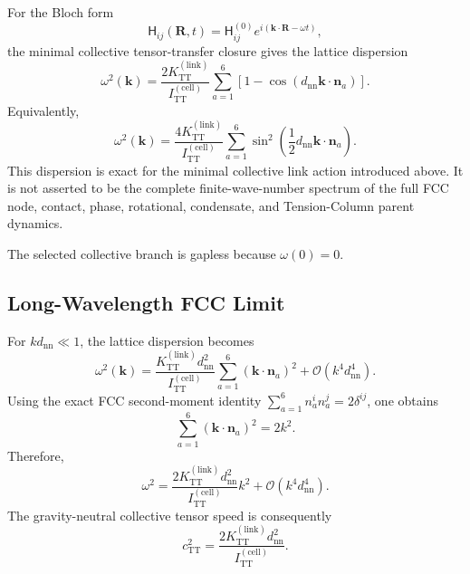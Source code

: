 For the Bloch form
\begin{equation}
    \mathsf{H}_{ij}(\mathbf{R},t) = \mathsf{H}_{ij}^{(0)} e^{i(\mathbf{k}\cdot\mathbf{R}-\omega t)},
\end{equation}
the minimal collective tensor-transfer closure gives the lattice dispersion
\begin{equation}
    \omega^{2}(\mathbf{k}) = \frac{ 2K_{\mathrm{TT}}^{(\mathrm{link})} }{ I_{\mathrm{TT}}^{(\mathrm{cell})} } \sum_{a=1}^{6} \left[ 1 - \cos \left( d_{\mathrm{nn}} \mathbf{k}\cdot\mathbf{n}_{a} \right) \right].
\end{equation}
Equivalently,
\begin{equation}
    \omega^{2}(\mathbf{k}) = \frac{ 4K_{\mathrm{TT}}^{(\mathrm{link})} }{ I_{\mathrm{TT}}^{(\mathrm{cell})} } \sum_{a=1}^{6} \sin^{2} \left( \frac{1}{2} d_{\mathrm{nn}} \mathbf{k}\cdot\mathbf{n}_{a} \right).
\end{equation}
This dispersion is exact for the minimal collective link action introduced above. It is not asserted to be the complete finite-wave-number spectrum of the full FCC node, contact, phase, rotational, condensate, and Tension-Column parent dynamics.

The selected collective branch is gapless because $\omega(0)=0$.

\subsection{Long-Wavelength FCC Limit}
\label{subsec:long_wavelength_fcc_limit}

For $k d_{\mathrm{nn}} \ll 1$, the lattice dispersion becomes
\begin{equation}
    \omega^{2}(\mathbf{k}) = \frac{ K_{\mathrm{TT}}^{(\mathrm{link})} d_{\mathrm{nn}}^{2} }{ I_{\mathrm{TT}}^{(\mathrm{cell})} } \sum_{a=1}^{6} (\mathbf{k}\cdot\mathbf{n}_{a})^{2} + \mathcal{O} \left( k^{4}d_{\mathrm{nn}}^{4} \right).
\end{equation}
Using the exact FCC second-moment identity $\sum_{a=1}^{6} n_{a}^{i}n_{a}^{j} = 2\delta^{ij}$, one obtains
\begin{equation}
    \sum_{a=1}^{6} (\mathbf{k}\cdot\mathbf{n}_{a})^{2} = 2k^{2}.
\end{equation}
Therefore,
\begin{equation}
    \omega^{2} = \frac{ 2K_{\mathrm{TT}}^{(\mathrm{link})} d_{\mathrm{nn}}^{2} }{ I_{\mathrm{TT}}^{(\mathrm{cell})} } k^{2} + \mathcal{O} \left( k^{4}d_{\mathrm{nn}}^{4} \right).
\end{equation}
The gravity-neutral collective tensor speed is consequently
\begin{equation}
    c_{\mathrm{TT}}^{2} = \frac{ 2K_{\mathrm{TT}}^{(\mathrm{link})} d_{\mathrm{nn}}^{2} }{ I_{\mathrm{TT}}^{(\mathrm{cell})} }.
\end{equation}

